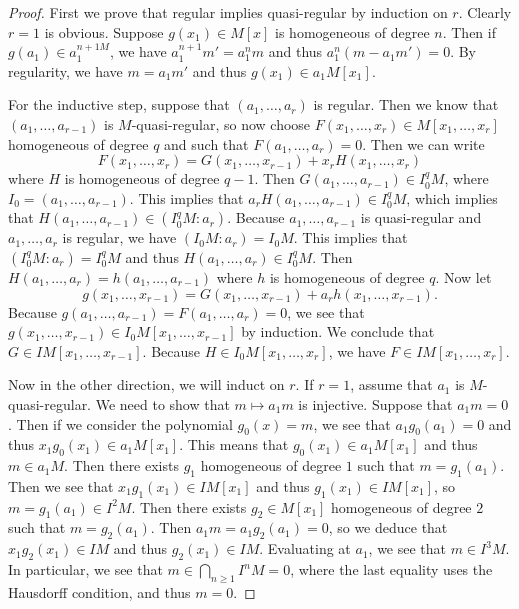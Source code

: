 \documentclass[leqno, openany]{memoir}
\theoremstyle{definition}
\theoremstyle{remark}
\theoremstyle{plain}
\theoremstyle{definition}
\theoremstyle{remark}
\begin{document}
\begin{proof} First we prove that regular implies quasi-regular by induction on
    $r$. Clearly $r=1$ is obvious. Suppose $g(x_1) \in M[x]$ is homogeneous of
    degree $n$. Then if $g(a_1) \in a_1^{n+1M}$, we have $a_1^{n+1}m' = a_1^n
    m$ and thus $a_1^n(m-a_1 m') = 0$. By regularity, we have $m = a_1 m'$ and
    thus $g(x_1) \in a_1 M[x_1]$.

    For the inductive step, suppose that $(a_1, \ldots, a_r)$ is regular. Then
    we know that $(a_1, \ldots, a_{r-1})$ is $M$-quasi-regular, so now choose
    $F(x_1, \ldots, x_r) \in M[x_1, \ldots, x_r]$ homogeneous of degree $q$ and
    such that $F(a_1, \ldots, a_r) = 0$. Then we can write \[ F(x_1, \ldots,
    x_r) = G(x_1, \ldots, x_{r-1}) + x_r H(x_1, \ldots, x_r) \] where $H$ is
    homogeneous of degree $q-1$. Then $G(a_1, \ldots, a_{r-1}) \in I_0^q M$,
    where $I_0 = (a_1, \ldots, a_{r-1})$. This implies that $a_r H(a_1, \ldots,
    a_{r-1}) \in I_0^q M$, which implies that $H(a_1, \ldots, a_{r-1}) \in
    (I_0^q M : a_r)$. Because $a_1, \ldots, a_{r-1}$ is quasi-regular and $a_1,
    \ldots, a_r$ is regular, we have $(I_0 M : a_r) = I_0 M$. This implies that
    $(I_0^q M : a_r) = I_0^q M$ and thus $H(a_1, \ldots, a_r) \in I_0^q M$.
    Then $H(a_1, \ldots, a_r) = h(a_1, \ldots, a_{r-1})$ where $h$ is
    homogeneous of degree $q$. Now let \[ g(x_1, \ldots, x_{r-1}) = G(x_1,
    \ldots, x_{r-1}) + a_r h(x_1, \ldots, x_{r-1}). \] Because $g(a_1, \ldots,
    a_{r-1}) = F(a_1, \ldots, a_r) = 0$, we see that $g(x_1, \ldots, x_{r-1})
    \in I_0 M [ x_1, \ldots, x_{r-1} ]$ by induction. We conclude that $G \in
    IM[x_1, \ldots, x_{r-1}]$. Because $H \in I_0 M[x_1, \ldots, x_r]$, we have
    $F \in IM[x_1, \ldots, x_r]$.

    Now in the other direction, we will induct on $r$. If $r=1$, assume that
    $a_1$ is $M$-quasi-regular. We need to show that $m \mapsto a_1 m$ is
    injective. Suppose that $a_1 m = 0$. Then if we consider the polynomial
    $g_0(x) = m$, we see that $a_1 g_0(a_1) = 0$ and thus $x_1 g_0(x_1) \in a_1
    M[x_1]$. This means that $g_0(x_1) \in a_1 M[x_1]$ and thus $m \in a_1 M$.
    Then there exists $g_1$ homogeneous of degree $1$ such that $m = g_1(a_1)$.
    Then we see that $x_1 g_1(x_1) \in IM[x_1]$ and thus $g_1(x_1) \in
    IM[x_1]$, so $m = g_1(a_1) \in I^2 M$. Then there exists $g_2 \in M[x_1]$
    homogeneous of degree $2$ such that $m = g_2(a_1)$. Then $a_1 m = a_1
    g_2(a_1) = 0$, so we deduce that $x_1 g_2(x_1) \in IM$ and thus $g_2(x_1)
    \in IM$. Evaluating at $a_1$, we see that $m \in I^3 M$. In particular, we
    see that $m \in \bigcap_{n \geq 1} I^n M = 0$, where the last equality uses
    the Hausdorff condition, and thus $m = 0$.


\end{proof}
\end{document}
